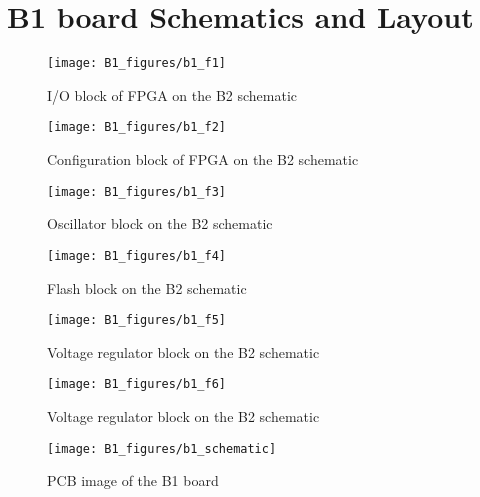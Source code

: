 \chapter{B1 board Schematics and Layout}

\begin{figure}
 \centering
 \texttt{[image: B1\_figures/b1\_f1]}
 \caption{I/O block of FPGA on the B2 schematic}
 \label{fig:b1_sch_1}
\end{figure}

\begin{figure}
 \centering
 \texttt{[image: B1\_figures/b1\_f2]}
 \caption{Configuration block of FPGA on the B2 schematic}
 \label{fig:b1_sch_2}
\end{figure}

\begin{figure}
 \centering
 \texttt{[image: B1\_figures/b1\_f3]}
 \caption{Oscillator block on the B2 schematic}
 \label{fig:b1_sch_3}
\end{figure}

\begin{figure}
 \centering
 \texttt{[image: B1\_figures/b1\_f4]}
 \caption{Flash block on the B2 schematic}
 \label{fig:b1_sch_4}
\end{figure}

\begin{figure}
 \centering
 \texttt{[image: B1\_figures/b1\_f5]}
 \caption{Voltage regulator block on the B2 schematic}
 \label{fig:b1_sch_5}
\end{figure}

\begin{figure}
 \centering
 \texttt{[image: B1\_figures/b1\_f6]}
 \caption{Voltage regulator block on the B2 schematic}
 \label{fig:b1_sch_6}
\end{figure}

\begin{figure}
 \centering
 \texttt{[image: B1\_figures/b1\_schematic]}
 \caption{PCB image of the B1 board}
 \label{fig:b1_sch_7}
\end{figure}